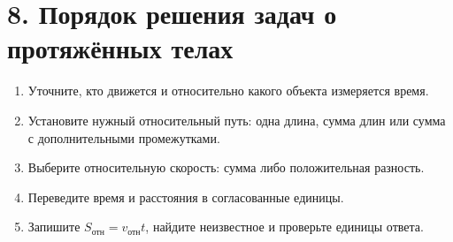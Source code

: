 \documentclass[a4paper,12pt]{article}
\begin{document}
\section*{8. Порядок решения задач о протяжённых телах}
\begin{enumerate}
\item Уточните, кто движется и относительно какого объекта измеряется время.
\item Установите нужный относительный путь: одна длина, сумма длин или сумма с дополнительными промежутками.
\item Выберите относительную скорость: сумма либо положительная разность.
\item Переведите время и расстояния в согласованные единицы.
\item Запишите $S_{\text{отн}}=v_{\text{отн}}t$, найдите неизвестное и проверьте единицы ответа.
\end{enumerate}
\end{document}
